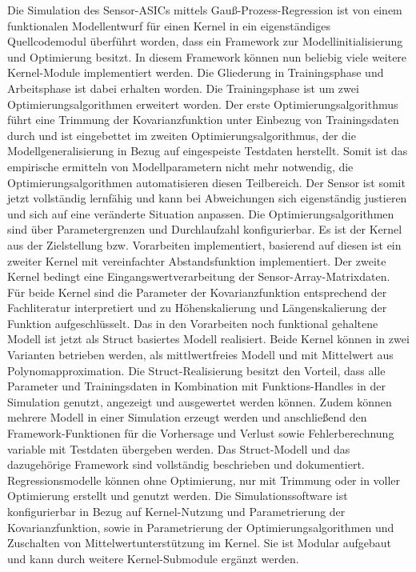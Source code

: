 \newline
Die Simulation des Sensor-ASICs mittels Gauß-Prozess-Regression ist von einem funktionalen Modellentwurf für einen Kernel in ein eigenständiges Quellcodemodul überführt worden, dass ein Framework zur Modellinitialisierung und Optimierung besitzt. In diesem Framework können nun beliebig viele weitere Kernel-Module implementiert werden. Die Gliederung in Trainingsphase und Arbeitsphase ist dabei erhalten worden. Die Trainingsphase ist um zwei Optimierungsalgorithmen erweitert worden. Der erste Optimierungsalgorithmus führt eine Trimmung der Kovarianzfunktion unter Einbezug von Trainingsdaten durch und ist eingebettet im zweiten Optimierungsalgorithmus, der die Modellgeneralisierung in Bezug auf eingespeiste Testdaten herstellt. Somit ist das empirische ermitteln von Modellparametern nicht mehr notwendig, die Optimierungsalgorithmen automatisieren diesen Teilbereich. Der Sensor ist somit jetzt vollständig lernfähig und kann bei Abweichungen sich eigenständig justieren und sich auf eine veränderte Situation anpassen. Die Optimierungsalgorithmen sind über Parametergrenzen und Durchlaufzahl konfigurierbar. Es ist der Kernel aus der Zielstellung bzw. Vorarbeiten implementiert, basierend auf diesen ist ein zweiter Kernel mit vereinfachter Abstandsfunktion implementiert. Der zweite Kernel bedingt eine Eingangswertverarbeitung der Sensor-Array-Matrixdaten. Für beide Kernel sind die Parameter der Kovarianzfunktion entsprechend der Fachliteratur interpretiert und zu Höhenskalierung und Längenskalierung der Funktion aufgeschlüsselt. Das in den Vorarbeiten noch funktional gehaltene Modell ist jetzt als Struct basiertes Modell realisiert. Beide Kernel können in zwei Varianten betrieben werden, als mittlwertfreies Modell und mit Mittelwert aus Polynomapproximation. Die Struct-Realisierung besitzt den Vorteil, dass alle Parameter und Trainingsdaten in Kombination mit Funktions-Handles in der Simulation genutzt, angezeigt und ausgewertet werden können. Zudem können mehrere Modell in einer Simulation erzeugt werden und anschließend den Framework-Funktionen für die Vorhersage und Verlust sowie Fehlerberechnung variable mit Testdaten übergeben werden. Das Struct-Modell und das dazugehörige Framework sind vollständig beschrieben und dokumentiert. Regressionsmodelle können ohne Optimierung, nur mit Trimmung oder in voller Optimierung erstellt und genutzt werden. Die Simulationssoftware ist konfigurierbar in Bezug auf Kernel-Nutzung und Parametrierung der Kovarianzfunktion, sowie in Parametrierung der Optimierungsalgorithmen und Zuschalten von Mittelwertunterstützung im Kernel. Sie ist Modular aufgebaut und kann durch weitere Kernel-Submodule ergänzt werden.
